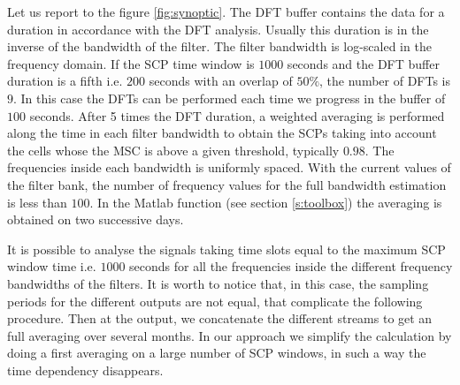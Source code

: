 Let us report to the figure \ref{fig:synoptic}. The DFT buffer contains the data for a duration in accordance with the DFT analysis. Usually this duration is in the inverse of the bandwidth of the filter. The filter bandwidth is log-scaled in the frequency domain. If the SCP time window is $1000$ seconds and the DFT buffer duration is  a fifth i.e. $200$ seconds with an overlap of $50\%$, the number of DFTs  is $9$. In this case the DFTs can be performed each time we progress in the buffer of $100$ seconds. After 5 times the DFT duration, a weighted averaging is performed along the time in each filter bandwidth to obtain the SCPs taking into account the cells whose the MSC is above a given threshold, typically $0.98$. The frequencies inside each bandwidth is uniformly spaced. With the current values of the filter bank, the number of frequency values for the full bandwidth estimation is less than $100$. In the Matlab function (see section \ref{s:toolbox}) the averaging is obtained on two successive days.

It is possible to analyse the signals taking time slots equal to the maximum SCP window time i.e. $1000$ seconds for all the frequencies inside the different frequency bandwidths of the filters. It is worth to notice that, in this case, the sampling periods for the different outputs are not equal, that complicate the following procedure. Then at the output, we concatenate the different streams to get an full averaging over several months. In our approach we simplify the calculation by doing a first averaging on a large number of SCP windows, in such a way the time dependency disappears.


